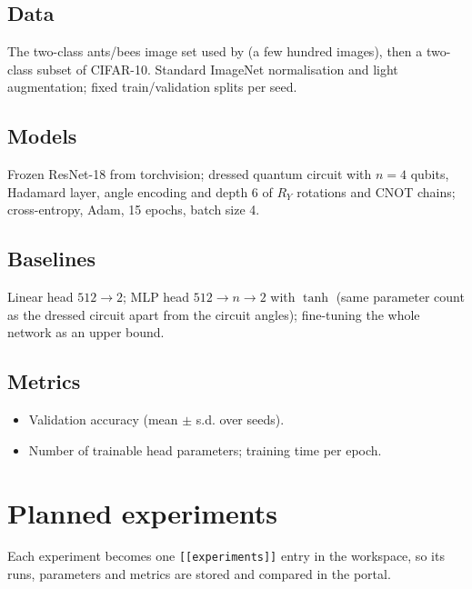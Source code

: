 \documentclass[11pt,a4paper]{article}
\begin{document}
\subsection{Data}
The two-class ants/bees image set used by \citet{mari2020} (a few hundred images), then a two-class
subset of CIFAR-10. Standard ImageNet normalisation and light augmentation; fixed train/validation
splits per seed.

\subsection{Models}
Frozen ResNet-18 from torchvision; dressed quantum circuit with $n=4$ qubits, Hadamard layer,
angle encoding and depth 6 of $R_Y$ rotations and CNOT chains; cross-entropy, Adam, 15 epochs,
batch size 4.

\subsection{Baselines}
Linear head $512\to2$; MLP head $512\to n\to2$ with $\tanh$ (same parameter count as the dressed
circuit apart from the circuit angles); fine-tuning the whole network as an upper bound.

\subsection{Metrics}
\begin{itemize}
  \item Validation accuracy (mean $\pm$ s.d. over seeds).
  \item Number of trainable head parameters; training time per epoch.
\end{itemize}

\section{Planned experiments}
Each experiment becomes one \texttt{[[experiments]]} entry in the workspace, so its runs, parameters
and metrics are stored and compared in the portal.
\end{document}
